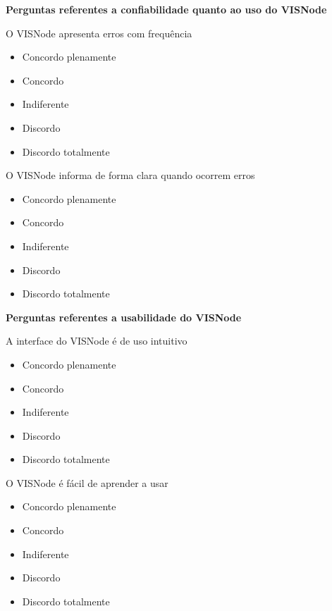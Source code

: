 \documentclass[
	12pt,				%
	oneside,			%
	a4paper,			%
	english,			%
	french,				%
	spanish,			%
	brazil,				%
	]{abntex2}
\makeatletter
\newcommand*{\radiobutton}{%
  \@ifstar{\@radiobutton0}{\@radiobutton1}%
}
\newcommand*{\@radiobutton}[1]{%
  \begin{tikzpicture}
    \pgfmathsetlengthmacro\radius{height("X")/2}
    \draw[radius=\radius] circle;
    \ifcase#1 \fill[radius=.6*\radius] circle;\fi
  \end{tikzpicture}%
}
\makeatother
\begin{document}
\begin{apendicesenv}
\vspace{3mm}

\noindent\textbf{Perguntas referentes a confiabilidade quanto ao uso do VISNode}

\vspace{3mm}

\noindent O VISNode apresenta erros com frequência

\begin{itemize}
\item[\radiobutton] Concordo plenamente
\item[\radiobutton] Concordo
\item[\radiobutton] Indiferente
\item[\radiobutton] Discordo
\item[\radiobutton] Discordo totalmente
\end{itemize}

\noindent O VISNode informa de forma clara quando ocorrem erros

\begin{itemize}
\item[\radiobutton] Concordo plenamente
\item[\radiobutton] Concordo
\item[\radiobutton] Indiferente
\item[\radiobutton] Discordo
\item[\radiobutton] Discordo totalmente
\end{itemize}

\vspace{3mm}

\noindent\textbf{Perguntas referentes a usabilidade do VISNode}

\vspace{3mm}

\noindent A interface do VISNode é de uso intuitivo

\begin{itemize}
\item[\radiobutton] Concordo plenamente
\item[\radiobutton] Concordo
\item[\radiobutton] Indiferente
\item[\radiobutton] Discordo
\item[\radiobutton] Discordo totalmente
\end{itemize}

\noindent O VISNode é fácil de aprender a usar

\begin{itemize}
\item[\radiobutton] Concordo plenamente
\item[\radiobutton] Concordo
\item[\radiobutton] Indiferente
\item[\radiobutton] Discordo
\item[\radiobutton] Discordo totalmente
\end{itemize}


\end{apendicesenv}
\end{document}
